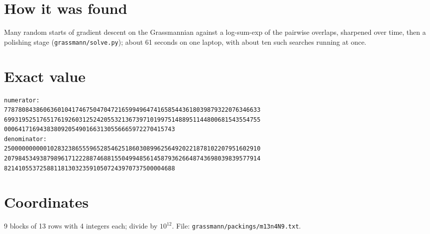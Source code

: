 \documentclass[11pt,a4paper]{article}
\begin{document}
\section{How it was found}
Many random starts of gradient descent on the Grassmannian against a log-sum-exp of the pairwise overlaps, sharpened over time, then a polishing stage (\texttt{grassmann/solve.py}); about 61 seconds on one laptop, with about ten such searches running at once.


\appendix
\section{Exact value}
{\small
\begin{verbatim}
numerator:
778780843860636010417467504704721659949647416585443618039879322076346633
699319525176517619260312524205532136739710199751488951144800681543554755
000641716943838092054901663130556665972270415743
denominator:
250000000000102832386555965285462518603089962564920221878102207951602910
207984534938798961712228874688155049948561458793626648743698039839577914
821410553725881181303235910507243970737500004688
\end{verbatim}}

\section{Coordinates}
9 blocks of 13 rows with 4 integers each; divide by $10^{12}$. File: \texttt{grassmann/packings/m13n4N9.txt}.
{\tiny
\begin{multicols}{3}
\end{multicols}}
\end{document}
